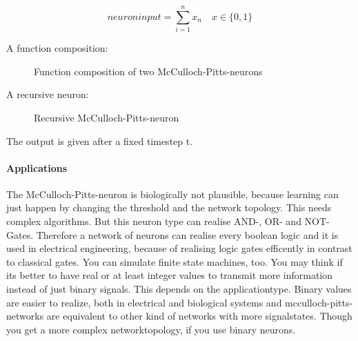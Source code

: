 \documentclass[10pt,a4paper,DIV=11]{scrreprt}
\begin{document}
\begin{equation}
neuroninput = \sum_{i=1}^{n} x_{n} \quad  x \in \{0, 1\}
\end{equation}


A function composition:

\begin{figure}[H]
	\centering
	\caption{Function composition of two McCulloch-Pitts-neurons}
	\label{fig:pitts2}
\end{figure}

A recursive neuron:

\begin{figure}[H]
	\centering
	\caption{Recursive McCulloch-Pitts-neuron}
	\label{fig:pitts3}
\end{figure}

The output is given after a fixed timestep t.

\paragraph{Applications}
The McCulloch-Pitts-neuron is biologically not plausible, because learning
can just happen by changing the threshold and the network topology. This
needs complex algorithms.
But this neuron type can realise AND-, OR- and NOT-Gates.
Therefore a network of neurons can realise every boolean logic and it is used in electrical engineering, because of realising logic gates efficently in contrast to classical gates. You can simulate finite state machines, too.
You may think if its better to have real or at least integer values to transmit more information instead of just binary signals. This depends on the applicationtype. Binary values are easier to realize, both in electrical and biological systems and mcculloch-pitts-networks are equivalent to other kind of networks with more signalstates. Though you get a more complex networktopology, if you use binary neurons.
\end{document}
